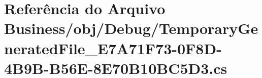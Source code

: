\hypertarget{Business_2obj_2Debug_2TemporaryGeneratedFile__E7A71F73-0F8D-4B9B-B56E-8E70B10BC5D3_8cs}{}\section{Referência do Arquivo Business/obj/\+Debug/\+Temporary\+Generated\+File\+\_\+\+E7\+A71\+F73-\/0\+F8\+D-\/4\+B9\+B-\/\+B56\+E-\/8\+E70\+B10\+B\+C5\+D3.cs}
\label{Business_2obj_2Debug_2TemporaryGeneratedFile__E7A71F73-0F8D-4B9B-B56E-8E70B10BC5D3_8cs}
